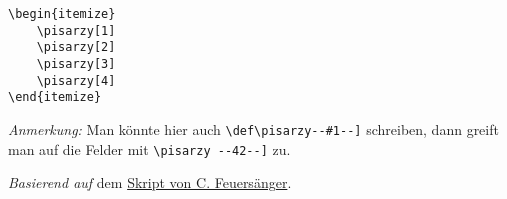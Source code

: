 			\begin{verbatim}
\begin{itemize}
    \pisarzy[1]
    \pisarzy[2]
    \pisarzy[3]
    \pisarzy[4]
\end{itemize}
			\end{verbatim}
			
			\begin{itemize}
				\pisarzy[1]
				\pisarzy[2]
				\pisarzy[3]
				\pisarzy[4]
			\end{itemize}
			
			\emph{Anmerkung:} Man könnte hier auch \verb|\def\pisarzy--#1--]| schreiben, dann greift man auf die Felder mit \verb|\pisarzy --42--]| zu.
			
			\emph{Basierend auf} dem \href{http://pgfplots.sourceforge.net/TeX-programming-notes.pdf}{Skript von C. Feuersänger}.


